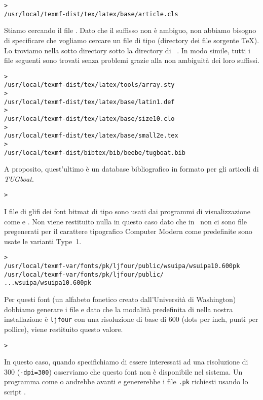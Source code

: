 \documentclass{article}
\begin{document}
\begin{alltt}
> 
   /usr/local/texmf-dist/tex/latex/base/article.cls
\end{alltt}
Stiamo cercando il file . Dato che il suffisso
 non è ambiguo, non abbiamo bisogno di specificare che vogliamo
cercare un file di tipo  (directory dei file sorgente \TeX). Lo 
troviamo
nella sotto directory  sotto la directory di \TL\
. In modo simile, tutti i file seguenti sono trovati
senza problemi grazie alla non ambiguità dei loro suffissi.
\begin{alltt}
> 
   /usr/local/texmf-dist/tex/latex/tools/array.sty
> 
   /usr/local/texmf-dist/tex/latex/base/latin1.def
> 
   /usr/local/texmf-dist/tex/latex/base/size10.clo
> 
   /usr/local/texmf-dist/tex/latex/base/small2e.tex
> 
   /usr/local/texmf-dist/bibtex/bib/beebe/tugboat.bib
\end{alltt}

A proposito, quest'ultimo è un database bibliografico in formato
\BibTeX{} per gli articoli di \textsl{TUGboat}.

\begin{alltt}
> 
\end{alltt}
I file di glifi dei font bitmat di tipo  sono usati dai
programmi di visualizzazione come \cmdname{dvips} e \cmdname{xdvi}. Non
viene restituito nulla in questo caso dato che in \TL\ non ci sono file
\samp{.pk} pregenerati per il carattere tipografico Computer Modern \Dash
come predefinite sono usate le varianti Type~1.
\begin{alltt}
> 
\ifSingleColumn   /usr/local/texmf-var/fonts/pk/ljfour/public/wsuipa/wsuipa10.600pk
\else /usr/local/texmf-var/fonts/pk/ljfour/public/
...                         wsuipa/wsuipa10.600pk
\fi\end{alltt}
Per questi font (un alfabeto fonetico creato dall'Università di
Washington) dobbiamo generare i file  e dato che la modalità
predefinita di \MF{} nella nostra installazione è \texttt{ljfour} con una
risoluzione di base di 600\dpi{} (dots per inch, punti per pollice), viene
restituito questo valore.
\begin{alltt}
> 
\end{alltt}
In questo caso, quando specifichiamo di essere interessati ad una
risoluzione di 300\dpi{} (\texttt{-dpi=300}) osserviamo che questo font
non è disponibile nel sistema. Un programma come \cmdname{dvips} o
\cmdname{xdvi} andrebbe avanti e genererebbe i file \texttt{.pk} richiesti
usando lo script \cmdname{mktexpk}.
\end{document}
